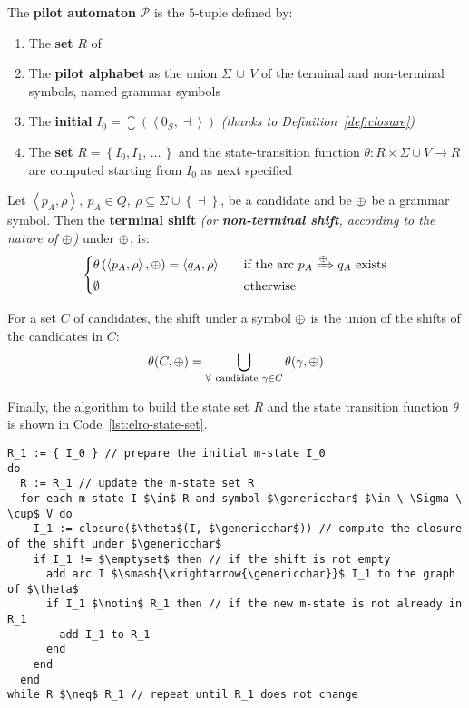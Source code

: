 \documentclass[english]{article}
\begin{document}
\begin{definition}
  \label{def:pilot-automaton}
  The \textbf{pilot automaton} \(\mathcal{P}\) is the \(5\)-tuple defined by:

  \begin{enumerate}
    \item The \textbf{set} \(R\) of \mstates
    \item The \textbf{pilot alphabet} as the union \(\Sigma \, \cup \, V\) of the terminal and non-terminal symbols, named grammar symbols
    \item The \textbf{initial \mstate} \(I_0 = \closure\left( \left\langle 0_S, \dashv \right\rangle \right)\) \textit{(thanks to Definition~\ref{def:closure})}
    \item The \textbf{\mstate set} \(R = \left\{ I_0, I_1, \,\ldots\, \right\}\) and the state-transition function \(\theta: R \times \Sigma \cup V \rightarrow R\) are computed starting from \(I_0\) as next specified
  \end{enumerate}
\end{definition}

Let \(\left\langle p_A, \rho \right\rangle, \ p_A \in Q, \ \rho \subseteq \Sigma \cup \left\{ \dashv \right\}\), be a candidate and be \(\oplus\) be a grammar symbol.
Then the \textbf{terminal shift} \textit{(or \textbf{non-terminal shift}, according to the nature of \(\oplus\))} under \(\oplus\), is:
\[\begin{cases}
    \theta \left( \left\langle p_A, \rho \right\rangle, \oplus \right) = \left\langle q_A, \rho \right\rangle \quad & \text{if the arc} \ p_A \xRightarrow{\oplus} q_A \ \text{exists} \\
    \emptyset \quad                                                                                                       & \text{otherwise}
  \end{cases}\]

For a set \(C\) of candidates, the shift under a symbol \(\oplus\) is the union of the shifts of the candidates in \(C\):
\[ \theta(C, \oplus) = \bigcup_{\forall \ \text{candidate} \ \gamma \in C} \theta(\gamma, \oplus) \]

Finally, the algorithm to build the state set \(R\) and the state transition function \(\theta\) is shown in Code~\ref{lst:elro-state-set}.

\begin{lstlisting}[caption={Algorithm to build \elro pilot graph}, label={lst:elro-state-set}]
R_1 := { I_0 } // prepare the initial m-state I_0
do
  R := R_1 // update the m-state set R
  for each m-state I $\in$ R and symbol $\genericchar$ $\in \ \Sigma \ \cup$ V do
    I_1 := closure($\theta$(I, $\genericchar$)) // compute the closure of the shift under $\genericchar$
    if I_1 != $\emptyset$ then // if the shift is not empty
      add arc I $\smash{\xrightarrow{\genericchar}}$ I_1 to the graph of $\theta$
      if I_1 $\notin$ R_1 then // if the new m-state is not already in R_1
        add I_1 to R_1
      end
    end
  end
while R $\neq$ R_1 // repeat until R_1 does not change
\end{lstlisting}
\end{document}
